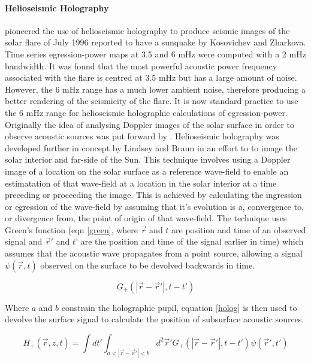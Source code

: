 {\paragraph{Helioseismic Holography}\label{helioholog}
\cite{1999ApJ...513L.143D} pioneered the use of helioseismic holography to produce seismic images of the solar flare of July 1996 reported to have a sunquake by Kosovichev and Zharkova. Time series egression-power maps at 3.5 and 6 mHz were computed with a 2 mHz bandwidth. It was found that the most powerful acoustic power frequency associated with the flare is centred at 3.5 mHz but has a large amount of noise. However, the 6 mHz range has a much lower ambient noise, therefore producing a better rendering of the seismicity of the flare. It is now standard practice to use the 6 mHz range for helioseismic holographic calculations of egression-power. \\
Originally the idea of analysing Doppler images of the solar surface in order to observe acoustic sources was put forward by \cite{1975CRASB.281...93R}. Helioseismic holography was developed further in concept by Lindsey and Braun \citep{1990SoPh..126..101L, 1992ApJ...392..739B, 1997ApJ...485..895L} in an effort to to image the solar interior and far-side of the Sun. This technique involves using a Doppler image of a location on the solar surface as a reference wave-field to enable an estimatation of that wave-field at a location in the solar interior at a time preceding or proceeding the image. This is achieved by calculating the ingression or egression of the wave-field by assuming that it's evolution is a, convergence to, or divergence from, the point of origin of that wave-field. The technique uses Green's function (eqn \ref{green}, where $\vec{r}$ and $t$ are position and time of an observed signal and $\vec{r}'$ and $t$' are the position and time of the signal earlier in time) which assumes that the acoustic wave propagates from a point source, allowing a signal $\psi(\vec{r},t)$ observed on the surface to be devolved backwards in time.

\begin{equation}\label{green}
G_{+}(|\vec{r}-\vec{r}'|,t-t')
\end{equation}

Where $a$ and $b$ constrain the holographic pupil, equation \ref{holog} is then used to devolve the surface signal to calculate the position of subsurface acoustic sources.

\begin{equation}\label{holog}
H_{+}(\vec{r},z,t)= \int dt'  \int_{a<|\vec{r}-\vec{r}'|<b} d^{2}\vec{r}'G_{+}(|\vec{r}-\vec{r}'|,t-t')\psi(\vec{r}',t')
\end{equation}

}
